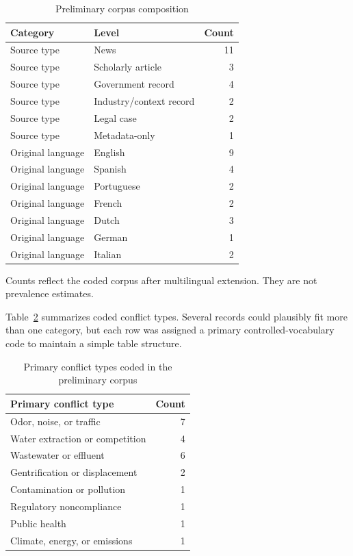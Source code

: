 \documentclass[man,12pt]{apa7}
\begin{document}
\begin{table}[t]
\centering
\caption{Preliminary corpus composition}
\label{tab:composition}
\begin{threeparttable}
\begin{tabular}{llr}
\toprule
Category & Level & Count \\
\midrule
Source type & News & 11 \\
Source type & Scholarly article & 3 \\
Source type & Government record & 4 \\
Source type & Industry/context record & 2 \\
Source type & Legal case & 2 \\
Source type & Metadata-only & 1 \\
\addlinespace
Original language & English & 9 \\
Original language & Spanish & 4 \\
Original language & Portuguese & 2 \\
Original language & French & 2 \\
Original language & Dutch & 3 \\
Original language & German & 1 \\
Original language & Italian & 2 \\
\bottomrule
\end{tabular}
\begin{tablenotes}
\small
\item Counts reflect the coded corpus after multilingual extension. They are not prevalence estimates.
\end{tablenotes}
\end{threeparttable}
\end{table}

Table~\ref{tab:conflict-types} summarizes coded conflict types. Several records could plausibly fit more than one category, but each row was assigned a primary controlled-vocabulary code to maintain a simple table structure.

\begin{table}[t]
\centering
\caption{Primary conflict types coded in the preliminary corpus}
\label{tab:conflict-types}
\begin{tabular}{lr}
\toprule
Primary conflict type & Count \\
\midrule
Odor, noise, or traffic & 7 \\
Water extraction or competition & 4 \\
Wastewater or effluent & 6 \\
Gentrification or displacement & 2 \\
Contamination or pollution & 1 \\
Regulatory noncompliance & 1 \\
Public health & 1 \\
Climate, energy, or emissions & 1 \\
\bottomrule
\end{tabular}
\end{table}
\end{document}
